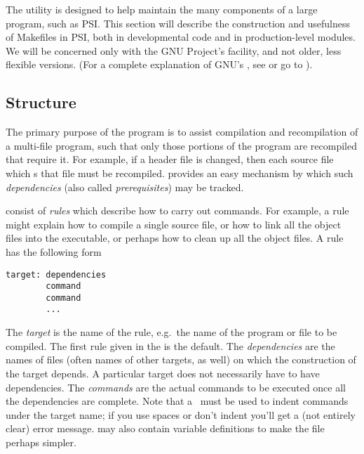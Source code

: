 %
%
%
%
The  utility is designed to help maintain the many
components of a large program, such as PSI.  This section will
describe the construction and usefulness of Makefiles in PSI, both in
developmental code and in production-level modules.  We will be
concerned only with the GNU Project's  facility, and not
older, less flexible versions.  (For a complete explanation of GNU's
, see  or go to ).

\subsection{ Structure}
The primary purpose of the  program is to assist
compilation and recompilation of a multi-file program, such that only
those portions of the program are recompiled that require it.  For
example, if a header file is changed, then each source file which
s that file must be recompiled.   provides
an easy mechanism by which such {\em dependencies} (also called {\em
prerequisites}) may be tracked.

 consist of {\em rules} which describe how to carry out commands.
For example, a rule might explain how to compile a single source file, or
how to link all the object files into the executable, or perhaps how to
clean up all the object files.  A rule has the following form
\begin{verbatim}
target: dependencies
        command
        command
        ...
\end{verbatim}
The {\em target} is the name of the rule, e.g.~the name of the program
or file to be compiled. The first rule given in the  is
the default.  The {\em dependencies} are the names of files (often
names of other targets, as well) on which the construction of the
target depends.  A particular target does not necessarily have to have
dependencies.  The {\em commands} are the actual commands to be
executed once all the dependencies are complete.  Note that a
 \ must be used to indent commands under the target
name; if you use spaces or don't indent you'll get a (not entirely
clear) error message.   may also contain
variable definitions to make the file perhaps simpler.

